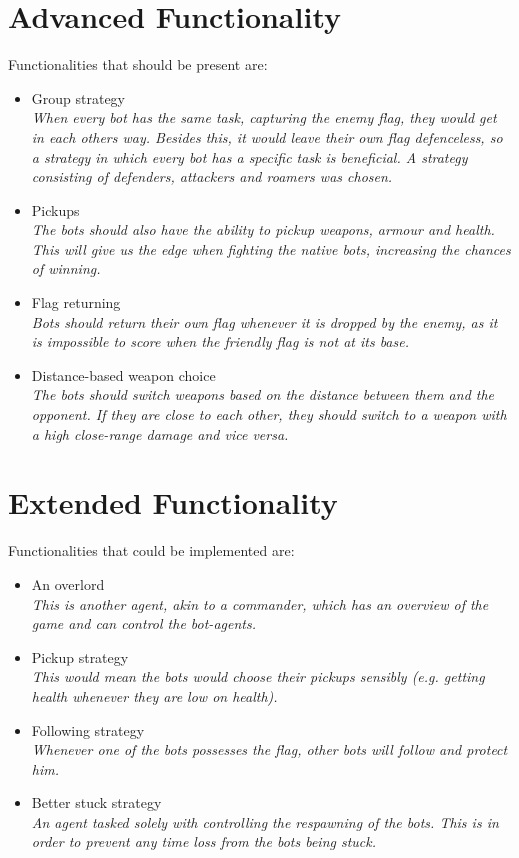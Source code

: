 \section{Advanced Functionality}
Functionalities that should be present are:
\begin{itemize}
	\item Group strategy \\
		\textit{When every bot has the same task, capturing the enemy flag, they would get in each others way. Besides this, it would leave their own flag defenceless, so a strategy in which every bot has a specific task is beneficial. A strategy consisting of defenders, attackers and roamers was chosen.}
	\item Pickups \\
		\textit{The bots should also have the ability to pickup weapons, armour and health. This will give us the edge when fighting the native bots, increasing the chances of winning.}
	\item Flag returning \\
		\textit{Bots should return their own flag whenever it is dropped by the enemy, as it is impossible to score when the friendly flag is not at its base.}
	\item Distance-based weapon choice \\
		\textit{The bots should switch weapons based on the distance between them and the opponent. If they are close to each other, they should switch to a weapon with a high close-range damage and vice versa.}
\end{itemize}

\section{Extended Functionality}
Functionalities that could be implemented are:
\begin{itemize}
	\item An overlord \\
		\textit{This is another agent, akin to a commander, which has an overview of the game and can control the bot-agents.}
	\item Pickup strategy \\
		\textit{This would mean the bots would choose their pickups sensibly (e.g. getting health whenever they are low on health).}
	\item Following strategy \\
		\textit{Whenever one of the bots possesses the flag, other bots will follow and protect him.}
	\item Better stuck strategy \\
		\textit{An agent tasked solely with controlling the respawning of the bots. This is in order to prevent any time loss from the bots being stuck.}
\end{itemize}

